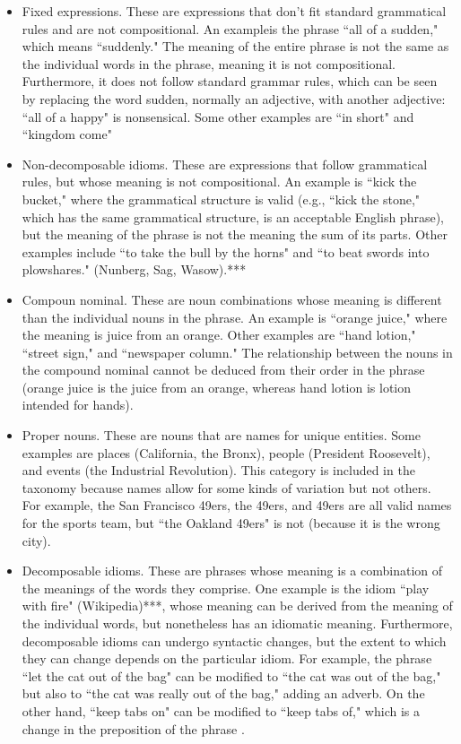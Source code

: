 \documentclass[11pt]{article}
\begin{document}
\begin{itemize}
\item Fixed expressions. These are expressions that don't fit standard grammatical rules and are not compositional. An exampleis the phrase ``all of a sudden," which means ``suddenly." The meaning of the entire phrase is not the same as the individual words in the phrase, meaning it is not compositional. Furthermore, it does not follow standard grammar rules, which can be seen by replacing the word sudden, normally an adjective, with another adjective: ``all of a happy" is nonsensical. Some other examples are ``in short" and ``kingdom come"

\item Non-decomposable idioms. These are expressions that follow grammatical rules, but whose meaning is not compositional. An example is ``kick the bucket," where the grammatical structure is valid (e.g., ``kick the stone," which has the same grammatical structure, is an acceptable English phrase), but the meaning of the phrase is not the meaning the sum of its parts. Other examples include ``to take the bull by the horns" and ``to beat swords into plowshares." (Nunberg, Sag, Wasow).***

\item Compoun nominal. These are noun combinations whose meaning is different than the individual nouns in the phrase. An example is ``orange juice," where the meaning is juice from an orange. Other examples are ``hand lotion," ``street sign," and ``newspaper column." The relationship between the nouns in the compound nominal cannot be deduced from their order in the phrase (orange juice is the juice from an orange, whereas hand lotion is lotion intended for hands).

\item Proper nouns. These are nouns that are names for unique entities. Some examples are places (California, the Bronx), people (President Roosevelt), and events (the Industrial Revolution). This category is included in the taxonomy because names allow for some kinds of variation but not others. For example, the San Francisco 49ers, the 49ers, and 49ers are all valid names for the sports team, but ``the Oakland 49ers" is not (because it is the wrong city).

\item Decomposable idioms. These are phrases whose meaning is a combination of the meanings of the words they comprise. One example is the idiom ``play with fire" (Wikipedia)***, whose meaning can be derived from the meaning of the individual words, but nonetheless has an idiomatic meaning. Furthermore, decomposable idioms can undergo syntactic changes, but the extent to which they can change depends on the particular idiom. For example, the phrase ``let the cat out of the bag" can be modified to ``the cat was out of the bag," but also to ``the cat was really out of the bag," adding an adverb. On the other hand, ``keep tabs on" can be modified to ``keep tabs of,"  which is a change in the preposition of the phrase \cite{Riehemann01aconstructional}. 


\end{itemize}
\end{document}
